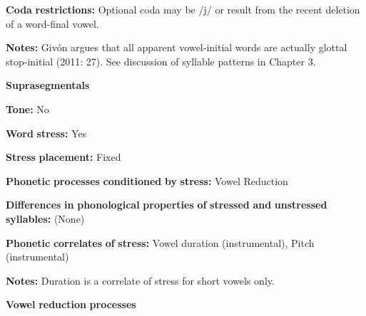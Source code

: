 \documentclass[output=paper]{langsci/langscibook}
\begin{document}
\begin{styleBody}
\textbf{Coda} \textbf{restrictions:} Optional coda may be /j/ or result from the recent deletion of a word-final vowel. 
\end{styleBody}

\begin{styleBody}
\textbf{Notes:} Givón argues that all apparent vowel-initial words are actually glottal stop-initial (2011: 27). See discussion of syllable patterns in Chapter 3.
\end{styleBody}

\begin{styleBody}
\textbf{Suprasegmentals}
\end{styleBody}

\begin{styleBody}
\textbf{Tone:} No
\end{styleBody}

\begin{styleBody}
\textbf{Word} \textbf{stress:} Yes
\end{styleBody}

\begin{styleBody}
\textbf{Stress} \textbf{placement:} Fixed
\end{styleBody}

\begin{styleBody}
\textbf{Phonetic} \textbf{processes} \textbf{conditioned} \textbf{by} \textbf{stress:} Vowel Reduction
\end{styleBody}

\begin{styleBody}
\textbf{Differences} \textbf{in} \textbf{phonological} \textbf{properties} \textbf{of} \textbf{stressed} \textbf{and} \textbf{unstressed} \textbf{syllables:} (None)
\end{styleBody}

\begin{styleBody}
\textbf{Phonetic} \textbf{correlates} \textbf{of} \textbf{stress:} Vowel duration (instrumental), Pitch (instrumental)
\end{styleBody}

\begin{styleBody}
\textbf{Notes:} Duration is a correlate of stress for short vowels only.
\end{styleBody}

\begin{styleBody}
\textbf{Vowel} \textbf{reduction} \textbf{processes}
\end{styleBody}
\end{document}
